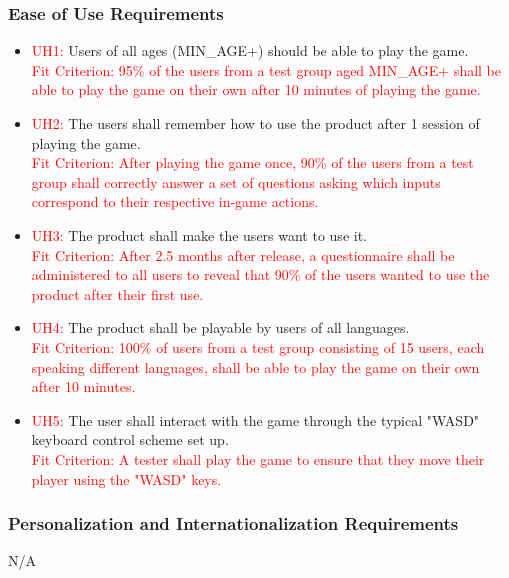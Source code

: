 \documentclass[12pt, titlepage]{article}
\begin{document}
\subsubsection{Ease of Use Requirements}
\begin{itemize}
\item \textcolor{red}{UH1: }Users of all ages (MIN\_AGE+) should be able to play the game.\\
\textcolor{red}{Fit Criterion: 95\% of the users from a test group aged MIN\_AGE+ shall be able to play the game on their own after 10 minutes of playing the game.}
\item \textcolor{red}{UH2: }The users shall remember how to use the product after 1 session of playing the game.\\
\textcolor{red}{Fit Criterion: After playing the game once, 90\% of the users from a test group shall correctly answer a set of questions asking which inputs correspond to their respective in-game actions.}
\item \textcolor{red}{UH3: }The product shall make the users want to use it.\\
\textcolor{red}{Fit Criterion: After 2.5 months after release, a questionnaire shall be administered to all users to reveal that 90\% of the users wanted to use the product after their first use.}
\item \textcolor{red}{UH4: }The product shall be playable by users of all languages.\\
\textcolor{red}{Fit Criterion: 100\% of users from a test group consisting of 15 users, each speaking different languages, shall be able to play the game on their own after 10 minutes.}
\item \textcolor{red}{UH5: }The user shall interact with the game through the typical "WASD" keyboard control scheme set up.\\
\textcolor{red}{Fit Criterion: A tester shall play the game to ensure that they move their player using the "WASD" keys.}
\end{itemize}

\subsubsection{ Personalization and Internationalization Requirements}
N/A
\end{document}
